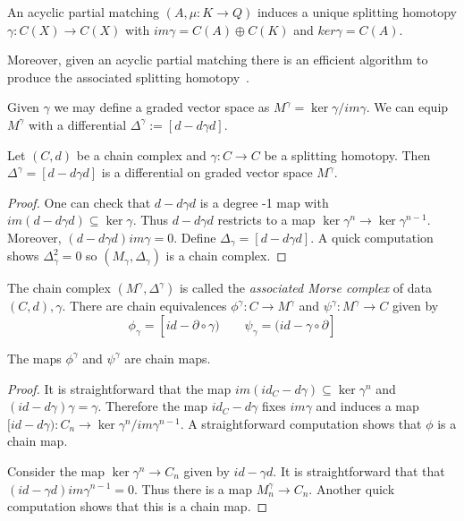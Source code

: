 \begin{prop}\label{prop:matchinghomotopy}
An acyclic partial matching $(A,\mu:K\to Q)$ induces a unique splitting homotopy $\gamma:C(X)\to C(X)$ with $im\gamma = C(A)\oplus C(K)$ and $ker\gamma = C(A)$.
\end{prop}

Moreover, given an acyclic partial matching there is an efficient algorithm to produce the associated splitting homotopy~\cite[Algorithm 3.12 (Gamma Algorithm)]{focm}.  



Given $\gamma$ we may define a graded vector space as $M^\gamma = \ker\gamma/ im \gamma$.  We can equip $M^\gamma$ with a differential $\Delta^\gamma:=[d-d\gamma d]$.

\begin{prop}
Let $(C,d)$ be a chain complex and $\gamma:C\to C$ be a splitting homotopy.  Then $\Delta^\gamma = [d-d\gamma d]$ is a differential on graded vector space $M^\gamma$.
\end{prop}
\begin{proof}
One can check that $d-d\gamma d$ is a degree -1 map with $im(d-d\gamma d)\subseteq \ker \gamma$.  Thus $d-d\gamma d$ restricts to a map $\ker\gamma^n \to \ker\gamma^{n-1}$. Moreover, $(d-d\gamma d)im\gamma= 0$.  Define $\Delta_\gamma=[d - d\gamma d]$.  A quick computation shows $\Delta_\gamma^2 = 0$ so $(M_\gamma,\Delta_\gamma)$ is a chain complex.
\end{proof}


The chain complex $(M^\gamma,\Delta^\gamma)$ is called the {\em associated Morse complex} of data $(C,d),\gamma$.  There are chain equivalences $\phi^\gamma:C\to M^\gamma$ and $\psi^\gamma:M^\gamma\to C$ given by $$\phi_\gamma =[id - \partial \circ \gamma)\quad\quad \psi_\gamma = (id - \gamma\circ \partial]$$

\begin{prop}
The maps $\phi^\gamma$ and $\psi^\gamma$ are chain maps.
\end{prop}
\begin{proof}
It is straightforward that the map $im(id_C-d\gamma)\subseteq \ker \gamma^n$ and $(id-d\gamma)\gamma = \gamma$.  Therefore the map $id_C-d\gamma$ fixes $im\gamma$ and induces a map $[id-d\gamma):C_n\to \ker\gamma^n/im\gamma^{n-1}$.  A straightforward computation shows that $\phi$ is a chain map.

Consider the map $\ker\gamma^n \to C_n$ given by $id-\gamma d$.  It is straightforward that that $(id-\gamma d)im\gamma^{n-1}=0$.  Thus there is a map $M^\gamma_n\to C_n$.  Another quick computation shows that this is a chain map.
\end{proof}

